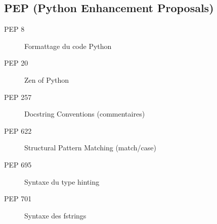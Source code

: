 \documentclass{article}
\begin{document}
\begin{multicols*}{4}
\subsection*{PEP (Python Enhancement Proposals)}
\begin{description}
    \item[PEP 8] Formattage du code Python
    \item[PEP 20] Zen of Python
    \item[PEP 257] Docstring Conventions (commentaires)
    \item[PEP 622] Structural Pattern Matching (match/case)
    \item[PEP 695] Syntaxe du type hinting
    \item[PEP 701] Syntaxe des fstrings
\end{description}

\end{multicols*}
\end{document}
